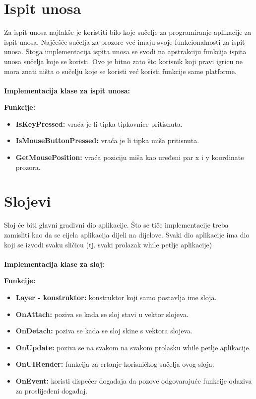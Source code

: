 \documentclass{mathos}
\begin{document}
\section{Ispit unosa}
Za ispit unosa najlakše je koristiti bilo koje sučelje za programiranje aplikacije za ispit unosa. Najčešće sučelja za prozore već imaju svoje funkcionalnosti za ispit unosa.
Stoga implementacija ispita unosa se svodi na apstrakciju funkcija ispita unosa sučelja koje se koristi. Ovo je bitno zato što korisnik koji pravi igricu ne mora znati ništa o
sučelju koje se koristi već koristi funkcije same platforme.
\\ \\
\textbf{Implementacija klase za ispit unosa:}

\textbf{Funkcije: }
\begin{itemize}
    \item \textbf{IsKeyPressed:} vraća je li tipka tipkovnice pritisnuta.
    \item \textbf{IsMouseButtonPressed:} vraća je li tipka miša pritisnuta.
    \item \textbf{GetMousePosition:} vraća poziciju miša kao uređeni par x i y koordinate prozora.
\end{itemize}

\section{Slojevi}\label{s_slojevi}
Sloj će biti glavni gradivni dio aplikacije. Što se tiče implementacije treba zamisliti kao da se cijela aplikacija dijeli na dijelove. Svaki dio aplikacije ima dio koji se
izvodi svaku sličicu (tj. svaki prolazak while petlje aplikacije)
\\ \\
\textbf{Implementacija klase za sloj:}

\textbf{Funkcije: }
\begin{itemize}
    \item \textbf{Layer - konstruktor:} konstruktor koji samo postavlja ime sloja.
    \item \textbf{OnAttach:} poziva se kada se sloj stavi u vektor slojeva.
    \item \textbf{OnDetach:} poziva se kada se sloj skine s vektora slojeva.
    \item \textbf{OnUpdate:} poziva se na svakom na svakom prolasku while petlje aplikacije.
    \item \textbf{OnUIRender:} funkcija za crtanje korisničkog sučelja ovog sloja.
    \item \textbf{OnEvent:} koristi dispečer događaja da pozove odgovarajuće funkcije odaziva za proslijeđeni događaj.
\end{itemize}
\end{document}
